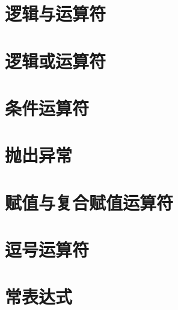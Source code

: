 \section{逻辑与运算符}
\section{逻辑或运算符}
\section{条件运算符}
\section{抛出异常}
\section{赋值与复合赋值运算符}
\section{逗号运算符}
\section{常表达式}

